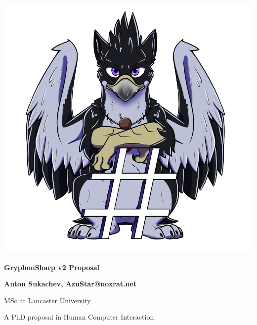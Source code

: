 \documentclass{article}
\begin{document}
\begin{titlepage}

    \center
    
    \includegraphics[scale=0.5]{AzuGryphonSharp.png} %
    
    \huge  \textbf{GryphonSharp v2 Proposal}
    
    \vspace{2cm}
    
    \Large \textbf{Anton Sukachev, AzuStar@noxrat.net}
    
    MSc at Lancaster University
    
    \vfill
    
    A PhD proposal in Human Computer Interaction
    
    \end{titlepage}
\pagebreak
\end{document}
